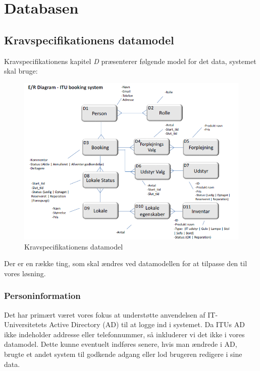 \section{Databasen}
\label{Technical_Database}

\subsection{Kravspecifikationens datamodel}
\label{Technical_Database_ks}
Kravspecifikationens kapitel \textit{D} \cite[s.14]{kravspec} præsenterer følgende model for det data, systemet skal bruge:
\begin{figure}[h!]
  \centering
    \includegraphics[width=\textwidth]{Chapters/Design/Technical/Images/KSdata}
  \caption{Kravspecifikationens datamodel}
\label{Fig:Technical_Database_ks_KSdata}
\end{figure}

Der er en række ting, som skal ændres ved datamodellen for at tilpasse den til vores løsning. 

\subsubsection{Personinformation}
\label{Technical_Database_ks_personinfo}
Det har primært været vores fokus at understøtte anvendelsen af IT-Universitetets Active Directory (AD) til at logge ind i systemet. Da ITUs AD ikke indeholder addresse eller telefonnummer, så inkluderer vi det ikke i vores datamodel. Dette kunne eventuelt indføres senere, hvis man ændrede i AD, brugte et andet system til godkende adgang eller lod brugeren redigere i sine data.

